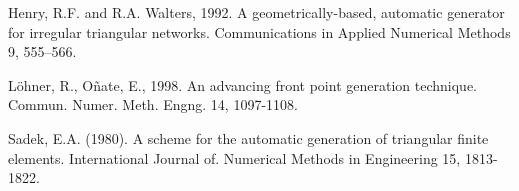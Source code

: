 \documentclass{article}
\begin{document}
\newpage

%
%

\begin{thebibliography}{99}


Henry, R.F. and R.A. Walters, 1992. 
A geometrically-based, automatic generator for irregular triangular networks. 
Communications in Applied Numerical Methods 9, 555--566.

L\"{o}hner, R., O\~{n}ate, E., 1998.
An advancing front point generation technique.
Commun. Numer. Meth. Engng. 14, 1097-1108.

Sadek, E.A. (1980). A scheme for the automatic generation of triangular finite elements.
International Journal of. Numerical Methods in Engineering 15, 1813-1822.


\end{thebibliography}
\end{document}
